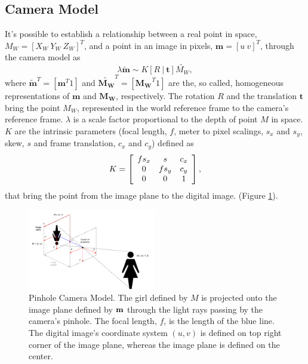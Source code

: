 \subsection{Camera Model}
\label{cha2:cameramodel}
It's possible to establish a relationship between a real point in space, $M_W = [X_W \ Y_W \ Z_W]^T$, and a point in an image in pixels, $\mathbf{m} = [u \ v]^T$, through the camera model as
\begin{equation}
 \lambda \mathbf{\widetilde{m}} \sim K [ R \ | \ \mathbf{t} ] \widetilde { M_W },
\end{equation}
where $\widetilde{\mathbf{m}}^T= [\mathbf{m}^T 1]$ and $\widetilde{\mathbf{M_W}}^T= [\mathbf{M_W}^T 1]$ are the, so called, homogeneous representations of $\mathbf{m}$ and $\mathbf{M_W}$, respectively.
The rotation $R$ and the translation $\mathbf{t}$ bring the point $M_W$, represented in the world reference frame to the camera's reference frame. $\lambda$ is a scale factor proportional to the depth of point $M$ in space. $K$ are the intrinsic parameters (focal length, $f$, meter to pixel scalings, $s_x$ and $s_y$, skew, $s$ and frame translation, $c_x$ and $c_y$) defined as
\begin{equation}
\label{sec2:eq:kmatrix}
K = \left[ 
\begin{array} { c c c } 
f s_x & s     & c_x \\ 
0 	  & f s_y & c_y \\ 
0     & 0     & 1   
\end{array} 
\right],
\end{equation} that bring the point from the image plane to the digital image. 
(Figure \ref{cha2:sec2:fig:camera_concepts}).   
\begin{figure}[ht]
	\centering
	\includegraphics[width=0.5\textwidth]{images/cameraconcepts.pdf}
	\caption[Pinhole Camera Model]{Pinhole Camera Model. The girl defined by $M$ is projected onto the image plane defined by $\bf m$ through the light rays passing by the camera's pinhole. The focal length, $f$, is the length of the blue line. The digital image's coordinate system $(u, v)$ is defined on top right corner of the image plane, whereas the image plane is defined on the center.}
	\label{cha2:sec2:fig:camera_concepts}
\end{figure}


